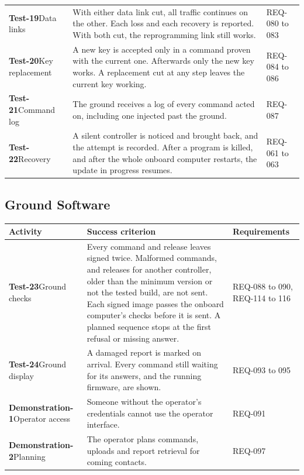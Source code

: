 \documentclass[11pt,a4paper]{article}
\begin{document}
{\begin{xltabular}{\textwidth}{@{}>{\raggedright\arraybackslash}p{3.0cm}>{\raggedright\arraybackslash}X>{\raggedright\arraybackslash}p{2.4cm}@{}}
\textbf{Test-19}\newline Data links & With either data link cut, all traffic continues on the other. Each loss and each recovery is reported. With both cut, the reprogramming link still works. & REQ-080 to 083 \\
\textbf{Test-20}\newline Key replacement & A new key is accepted only in a command proven with the current one. Afterwards only the new key works. A replacement cut at any step leaves the current key working. & REQ-084 to 086 \\
\textbf{Test-21}\newline Command log & The ground receives a log of every command acted on, including one injected past the ground. & REQ-087 \\
\textbf{Test-22}\newline Recovery & A silent controller is noticed and brought back, and the attempt is recorded. After a program is killed, and after the whole onboard computer restarts, the update in progress resumes. & REQ-061 to 063 \\
\bottomrule
\end{xltabular}}
\addtocounter{table}{-1}

\subsection{Ground Software}
{\footnotesize
\begin{xltabular}{\textwidth}{@{}>{\raggedright\arraybackslash}p{3.0cm}>{\raggedright\arraybackslash}X>{\raggedright\arraybackslash}p{2.4cm}@{}}
\toprule
Activity & Success criterion & Requirements \\
\midrule
\endhead
\textbf{Test-23}\newline Ground checks & Every command and release leaves signed twice. Malformed commands, and releases for another controller, older than the minimum version or not the tested build, are not sent. Each signed image passes the onboard computer's checks before it is sent. A planned sequence stops at the first refusal or missing answer. & REQ-088 to 090, REQ-114 to 116 \\
\textbf{Test-24}\newline Ground display & A damaged report is marked on arrival. Every command still waiting for its answers, and the running firmware, are shown. & REQ-093 to 095 \\
\textbf{Demonstration-1}\newline Operator access & Someone without the operator's credentials cannot use the operator interface. & REQ-091 \\
\textbf{Demonstration-2}\newline Planning & The operator plans commands, uploads and report retrieval for coming contacts. & REQ-097 \\
\bottomrule
\end{xltabular}}
\addtocounter{table}{-1}
\end{document}
